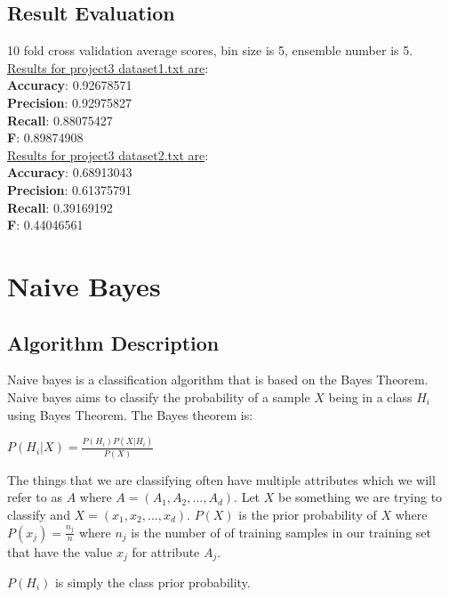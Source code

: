 \documentclass[paper=letter, fontsize=11pt]{article}
\numberwithin{equation}{section}		%
\numberwithin{figure}{section}			%
\numberwithin{table}{section}				%
\begin{document}
\subsection{Result Evaluation}
10 fold  cross validation average scores, bin size is 5, ensemble number is 5.
\\
\noindent \underline{ Results for project3 dataset1.txt are}: \\ 
\textbf{Accuracy}: 0.92678571\\
\textbf{Precision}: 0.92975827\\
\textbf{Recall}: 0.88075427\\
\textbf{F}: 0.89874908\\

\noindent \underline{ Results for project3 dataset2.txt are}: \\ 
\textbf{Accuracy}: 0.68913043\\
\textbf{Precision}: 0.61375791\\
\textbf{Recall}: 0.39169192\\
\textbf{F}: 0.44046561\\


\section{Naive Bayes}
\subsection{Algorithm Description}
Naive bayes is a classification algorithm that is based on the Bayes Theorem. Naive bayes aims to classify the probability of a sample $X$ being in a class $H_i$ using Bayes Theorem. The Bayes theorem is:\\
\begin{center} $P(H_i|X) = \frac{P(H_i)P(X|H_i)}{P(X)}$ \end{center}

\noindent The things that we are classifying often have multiple attributes which we will refer to as $A$ where $A = (A_1,A_2,...,A_d)$. Let $X$ be something we are trying to classify and $X = (x_1, x_2, ..., x_d)$. $P(X)$ is the prior probability of $X$ where $P(x_j) = \frac{n_j}{n}$ where $n_j$ is the number of of training samples in our training set that have the value $x_j$ for attribute $A_j$. 

$P(H_i)$ is simply the class prior probability. 
\end{document}

